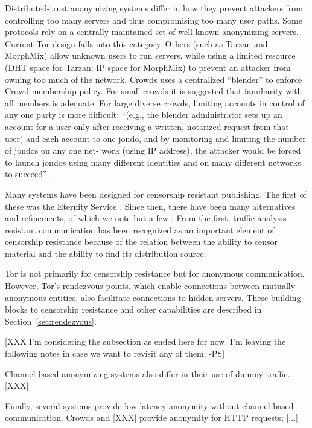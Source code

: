 \documentclass[times,10pt,twocolumn]{article}
\begin{document}
Distributed-trust anonymizing systems differ in how they prevent attackers
from controlling too many servers and thus compromising too many user paths.
Some protocols rely on a centrally maintained set of well-known anonymizing
servers.  Current Tor design falls into this category.
Others (such as Tarzan and MorphMix) allow unknown users to run
servers, while using a limited resource (DHT space for Tarzan; IP space for
MorphMix) to prevent an attacker from owning too much of the network.
Crowds uses a centralized ``blender'' to enforce Crowd membership
policy. For small crowds it is suggested that familiarity with all
members is adequate. For large diverse crowds, limiting accounts in
control of any one party is more difficult: 
``(e.g., the blender administrator sets up an account for a user only
after receiving a written, notarized request from that user) and each
account to one jondo, and by monitoring and limiting the number of
jondos on any one net- work (using IP address), the attacker would be
forced to launch jondos using many different identities and on many
different networks to succeed'' \cite{crowds-tissec}.


Many systems have been designed for censorship resistant publishing.
The first of these was the Eternity Service \cite{eternity}. Since
then, there have been many alternatives and refinements, of which we note
but a few
\cite{eternity,gap-pets03,freenet-pets00,freehaven-berk,publius,tangler,taz}.
From the first, traffic analysis resistant communication has been
recognized as an important element of censorship resistance because of
the relation between the ability to censor material and the ability to
find its distribution source.

Tor is not primarily for censorship resistance but for anonymous
communication. However, Tor's rendezvous points, which enable
connections between mutually anonymous entities, also facilitate
connections to hidden servers.  These building blocks to censorship
resistance and other capabilities are described in
Section~\ref{sec:rendezvous}.


[XXX I'm considering the subsection as ended here for now. I'm leaving the
following notes in case we want to revisit any of them. -PS]


Channel-based anonymizing systems also differ in their use of dummy traffic.
[XXX]

Finally, several systems provide low-latency anonymity without channel-based
communication.  Crowds and [XXX] provide anonymity for HTTP requests; [...]
\end{document}
